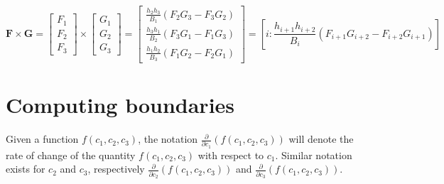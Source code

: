\documentclass{book}
\begin{document}
\begin{itemize}
\[\mathbf{F} \times \mathbf{G} = \begin{bmatrix} F_1 \\ F_2 \\ F_3 \end{bmatrix} \times \begin{bmatrix} G_1 \\ G_2 \\ G_3 \end{bmatrix}
 = \begin{bmatrix} \frac{h_2 h_3}{B_1}(F_2 G_3 - F_3 G_2) \\ \frac{h_3 h_1}{B_2}(F_3 G_1 - F_1 G_3) \\ \frac{h_1 h_2}{B_3}(F_1 G_2 - F_2 G_1) \end{bmatrix}
 = \left[i : \frac{h_{i+1} h_{i+2}}{B_i} (F_{i+1} G_{i+2} - F_{i+2} G_{i+1})\right]\]



%
%
%
%
%
\end{itemize}





\section{Computing boundaries}

Given a function \(f(c_1, c_2, c_3)\), the notation \(\frac{\partial}{\partial c_1}(f(c_1, c_2, c_3))\) will denote the rate of change of the quantity \(f(c_1, c_2, c_3)\) with respect to \(c_1\). Similar notation exists for \(c_2\) and \(c_3\), respectively \(\frac{\partial}{\partial c_2}(f(c_1, c_2, c_3))\) and \(\frac{\partial}{\partial c_3}(f(c_1, c_2, c_3))\).
\end{document}

